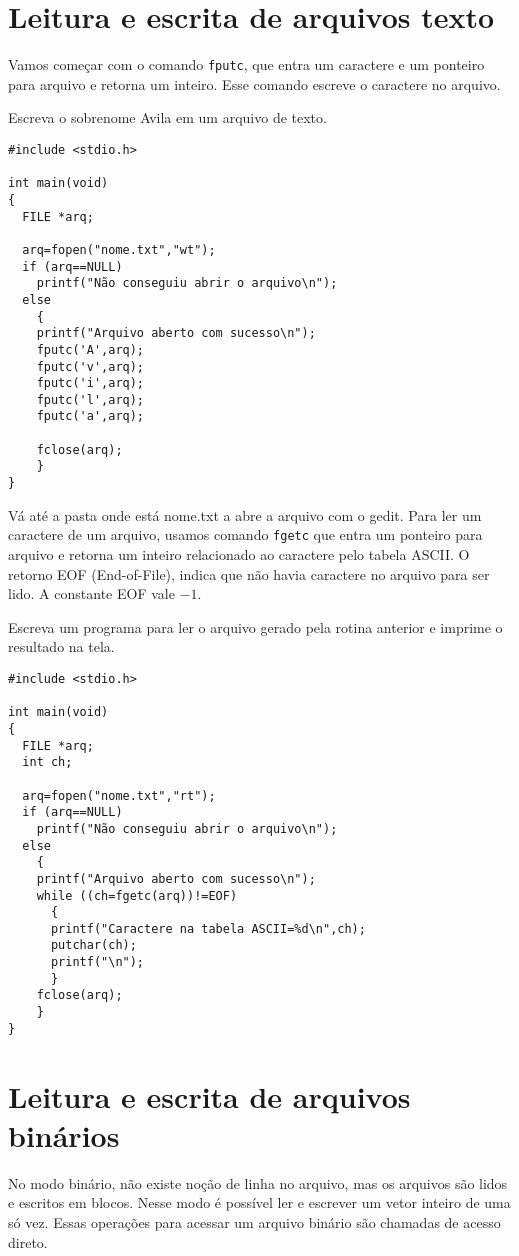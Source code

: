 \section{Leitura e escrita de arquivos texto}
Vamos começar com o comando \verb|fputc|, que entra um caractere e um ponteiro para arquivo e retorna um inteiro. Esse comando escreve o caractere no arquivo.
\begin{ex}
Escreva o sobrenome Avila em um arquivo de texto.
\end{ex}
\begin{verbatim}
#include <stdio.h>

int main(void)
{
  FILE *arq;
 
  arq=fopen("nome.txt","wt");
  if (arq==NULL) 
    printf("Não conseguiu abrir o arquivo\n");
  else 
    {
    printf("Arquivo aberto com sucesso\n");
    fputc('A',arq);
    fputc('v',arq);
    fputc('i',arq);
    fputc('l',arq);
    fputc('a',arq);

    fclose(arq);
    }
}
\end{verbatim}
Vá até a pasta onde está nome.txt a abre a arquivo com o gedit. Para ler um caractere de um arquivo, usamos comando \verb|fgetc| que entra um ponteiro para arquivo e retorna um inteiro relacionado ao caractere pelo tabela ASCII. O retorno EOF (End-of-File), indica que não havia caractere no arquivo para ser lido. A constante EOF vale $-1$.
\begin{ex}
Escreva um programa para ler o arquivo gerado pela rotina anterior e imprime o resultado na tela.
\end{ex}
\begin{verbatim}
#include <stdio.h>

int main(void)
{
  FILE *arq;
  int ch;
 
  arq=fopen("nome.txt","rt");
  if (arq==NULL) 
    printf("Não conseguiu abrir o arquivo\n");
  else 
    {
    printf("Arquivo aberto com sucesso\n");
    while ((ch=fgetc(arq))!=EOF)
      {
      printf("Caractere na tabela ASCII=%d\n",ch);
      putchar(ch);
      printf("\n");
      }
    fclose(arq);
    }
}
\end{verbatim}

\section{Leitura e escrita de arquivos binários}
No modo binário, não existe noção de linha no arquivo, mas os arquivos são lidos e escritos em blocos. Nesse modo é possível ler e escrever um vetor inteiro de uma só vez. Essas operações para acessar um arquivo binário são chamadas de acesso direto.

